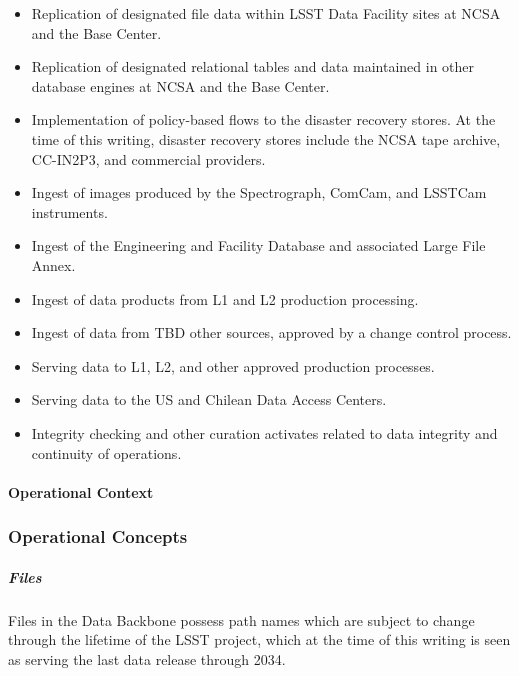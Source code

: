 \begin{itemize}

\item Replication of designated file data within LSST Data Facility sites
at NCSA and the Base Center.

\item Replication of designated relational tables and data maintained
in other database engines at NCSA and the Base Center.

\item Implementation of policy-based flows to the disaster recovery stores. At
the time of this writing, disaster recovery stores include the NCSA tape archive, CC-IN2P3,
and commercial providers.

\item Ingest of images produced by the Spectrograph, ComCam, and LSSTCam instruments. 

\item Ingest of the Engineering and Facility Database and associated Large File Annex.

\item Ingest of data products from L1 and L2 production processing.

\item Ingest of data from TBD other sources, approved by a change control process. 

\item Serving data to L1, L2, and other approved production processes.

\item Serving data to the US and Chilean Data Access Centers.

\item Integrity checking and other curation activates related to data integrity and
continuity of operations.

\end{itemize}

\paragraph{Operational Context}

\subsubsection{Operational Concepts}

\subparagraph{Files}

Files in the Data Backbone possess path names which are subject to change
through the lifetime of the LSST project, which at the time of this writing is 
seen as serving the last data release through 2034.

